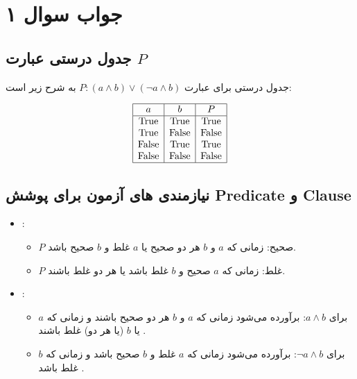 \section*{جواب سوال ۱}

\subsection*{جدول درستی عبارت \(P\)}
جدول درستی برای عبارت \(P \colon (a \land b) \lor (\neg a \land b)\) به شرح زیر است:

\[
\begin{array}{|c|c|c|}
	\hline
	a & b & P \\
	\hline
	\text{True} & \text{True} & \text{True} \\
	\text{True} & \text{False} & \text{False} \\
	\text{False} & \text{True} & \text{True} \\
	\text{False} & \text{False} & \text{False} \\
	\hline
\end{array}
\]

\subsection*{نیازمندی های آزمون برای پوشش Predicate و Clause}

\begin{itemize}
	\item \textbf{}:
	\begin{itemize}
		\item \(P\) صحیح: زمانی که \(a\) و \(b\) هر دو صحیح یا \(a\) غلط و \(b\) صحیح باشد.
		\item \(P\) غلط: زمانی که \(a\) صحیح و \(b\) غلط باشد یا هر دو غلط باشند.
	\end{itemize}
	
	\item \textbf{}:
	\begin{itemize}
		\item برای \(a \land b\): برآورده می‌شود زمانی که \(a\) و \(b\) هر دو صحیح باشند  و زمانی که \(a\) یا \(b\) (یا هر دو) غلط باشند  .
		\item برای \(\neg a \land b\): برآورده می‌شود زمانی که \(a\) غلط و \(b\) صحیح باشد  و زمانی که \(b\) غلط باشد  .
	\end{itemize}
\end{itemize}